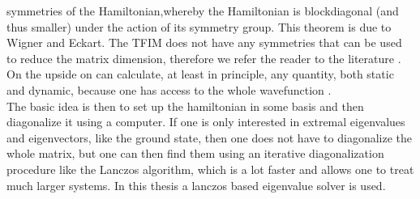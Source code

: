 \documentclass{article}
\begin{document}
symmetries of the Hamiltonian,whereby the Hamiltonian is blockdiagonal
(and thus smaller)
under the action of its symmetry group. This theorem is due to Wigner
and Eckart. The TFIM does not
have any symmetries that can be used to reduce the matrix dimension,
therefore we refer the reader to the literature
\cite{Laflorencie,Noack,Fehske}.\\
On the upside on can calculate, at least in principle, any quantity,
both static and dynamic, because one has access to the whole
wavefunction \cite{Noack}.\\
The basic idea is then to set up the hamiltonian in some basis and
then diagonalize it using a computer. If one is only interested in
extremal eigenvalues and eigenvectors, like the ground state, then one
does not have to diagonalize the whole matrix, but one can then find
them using an iterative diagonalization procedure like the Lanczos
algorithm, which is a lot faster and allows one to treat much larger
systems. In this thesis a lanczos based eigenvalue solver is used.\\
\end{document}
